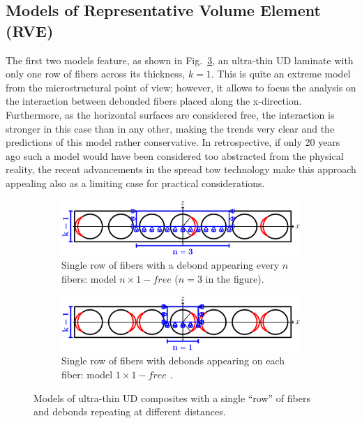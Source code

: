 \documentclass[review]{elsarticle}
\begin{document}
\subsection{Models of Representative Volume Element (RVE)}\label{subsec:rve}

The first two models feature, as shown in Fig.~\ref{fig:laminateModelsA}, an ultra-thin UD laminate with only one row of fibers across its thickness, $k=1$. This is quite an extreme model from the microstructural point of view; however, it allows to focus the analysis on the interaction between debonded fibers placed along the x-direction. Furthermore, as the horizontal surfaces are considered free, the interaction is stronger in this case than in any other, making the trends very clear and the predictions of this model rather conservative. In retrospective, if only 20 years ago such a model would have been considered too abstracted from the physical reality, the recent advancements in the spread tow technology make this approach appealing also as a limiting case for practical considerations.

\begin{figure}[!h]
\centering
    \begin{subfigure}[b]{\textwidth}
        \includegraphics[width=\textwidth]{freeThinPly.pdf}
        \caption{Single row of fibers with a debond appearing every $n$ fibers: model $n\times1-free$ ($n=3$ in the figure).}\label{subfig:freethinply}
    \end{subfigure}

    \begin{subfigure}[b]{\textwidth}
        \includegraphics[width=\textwidth]{freeThinPlyAllDebonds.pdf}
        \caption{Single row of fibers with debonds appearing on each fiber: model $1\times1-free$ .}\label{subfig:freethinplyalldebonds}
    \end{subfigure}

\caption{Models of ultra-thin UD composites with a single ``row'' of fibers and debonds repeating at different distances.}\label{fig:laminateModelsA}
\end{figure}
\end{document}

